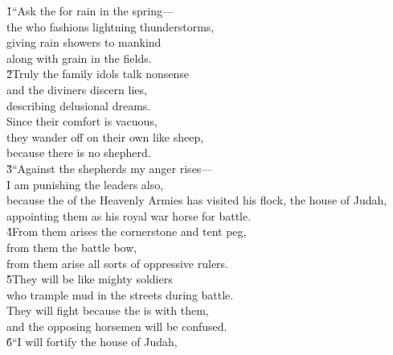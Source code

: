 \begin{poetry}
\poeml {}
\v{1}``Ask the  for rain in the spring--- \\
\poemll    the  who fashions lightning thunderstorms, \\
\poeml giving rain showers to mankind \\
\poemll    along with grain in the fields. \\
\poeml \v{2}Truly the family idols talk nonsense \\
\poemll    and the diviners discern lies, \\
\poemlll       describing delusional dreams. \\
\poeml Since their comfort is vacuous, \\
\poemll    they wander off on their own like sheep, \\
\poemlll       because there is no shepherd. \\
\poeml \v{3}``Against the shepherds my anger rises--- \\
\poemll    I am punishing the leaders also, \\
\poeml because the  of the Heavenly Armies has visited his flock, the house of Judah, \\
\poemll    appointing them as his royal war horse for battle. \\
\poeml \v{4}From them arises the cornerstone and tent peg, \\
\poemll    from them the battle bow, \\
\poemlll       from them arise all sorts of oppressive rulers. \\
\poeml \v{5}They will be like mighty soldiers \\
\poemll    who trample mud in the streets during battle. \\
\poeml They will fight because the  is with them, \\
\poemll    and the opposing horsemen will be confused. \\
\poeml \v{6}``I will fortify the house of Judah, \\

\end{poetry}
